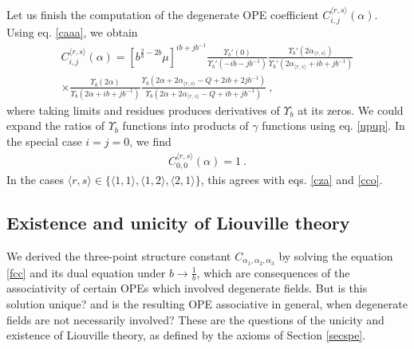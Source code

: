 \documentclass[12pt,a4paper,notitlepage]{report}
\numberwithin{equation}{section}
\theoremstyle{break}
\begin{document}
Let us finish the computation of the degenerate OPE coefficient $C_{i,j}^{\langle r,s \rangle}(\alpha)$.
Using eq. \eqref{caaa}, we obtain 
\begin{multline}
 C_{i,j}^{\langle r,s \rangle}(\alpha) = \left[b^{\frac{2}{b}-2b}\mu\right]^{ib+jb^{-1}} \frac{\Upsilon_b'(0)}{\Upsilon_b'(-ib-jb^{-1})} \frac{\Upsilon_b'(2\alpha_{\langle r,s \rangle})}{\Upsilon_b'(2\alpha_{\langle r,s \rangle}+ib+jb^{-1})}
\\ \times
 \frac{\Upsilon_b(2\alpha)}{\Upsilon_b(2\alpha+ib+jb^{-1})} \frac{\Upsilon_b(2\alpha+2\alpha_{\langle r,s \rangle}-Q+2ib+2jb^{-1})}{\Upsilon_b(2\alpha+2\alpha_{\langle r,s \rangle}-Q+ib+jb^{-1})} \ ,
\end{multline}
where taking limits and residues produces derivatives of $\Upsilon_b$ at its zeros.
We could expand the ratios of $\Upsilon_b$ functions into products of $\gamma$ functions using eq. \eqref{upup}.
In the special case $i=j=0$, we find
\begin{align}
 C_{0,0}^{\langle r,s \rangle}(\alpha) = 1 \ .
\end{align}
In the cases $\langle r,s \rangle \in \{\langle 1,1 \rangle , \langle 1,2 \rangle, \langle 2,1 \rangle\}$, 
this agrees with eqs. \eqref{cza} and \eqref{cco}.  

\subsection{Existence and unicity of Liouville theory}

We derived the three-point structure constant $C_{\alpha_1,\alpha_2,\alpha_3}$ by solving the equation \eqref{fcc} and its dual equation under $b\rightarrow \frac{1}{b}$, which are consequences of the associativity of certain OPEs which involved degenerate fields.
But is this solution unique? and is the resulting OPE associative in general, when degenerate fields are not necessarily involved? These are the questions of the unicity and existence of Liouville theory, as defined by the axioms of Section \ref{secspe}.
\end{document}
